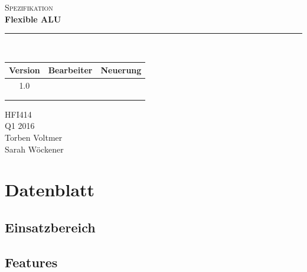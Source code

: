 \documentclass[11pt]{report}
\newcommand{\HRule}[1]{\rule{\linewidth}{#1}} 	%
\begin{document}
	\begin{titlepage}
		\begin{center}
			\textsc{\Large Spezifikation}\\
			
			{ \huge \bfseries Flexible ALU \\[0.4cm] }
			\HRule{0.5pt} \\[2.5cm]			
		\end{center}
		
		\begin{table}[h]
			\centering
			\begin{tabular}{l|l|l}
				\multicolumn{1}{c|}{\Large \textbf{  Version  }} & \multicolumn{1}{c|}{\Large \textbf{  Bearbeiter  }} & \multicolumn{1}{c}{\Large \textbf{  Neuerung  }} \\ \hline
				\multicolumn{1}{c|}{1.0}              & \multicolumn{1}{c|}{}                    & \multicolumn{1}{c}{}                  \\
				&                                          &                                       \\
				&                                          &                                      
			\end{tabular}
		\end{table}
		
		\vfill
		\begin{flushright}
			HFI414\\
			Q1 2016\\
			Torben Voltmer\\
			Sarah Wöckener\\
		\end{flushright}
	\end{titlepage}
	\tableofcontents
	
	\pagebreak
	
	\chapter{Datenblatt}
	
	\section{Einsatzbereich}
	
	\section{Features}
	
\end{document}
